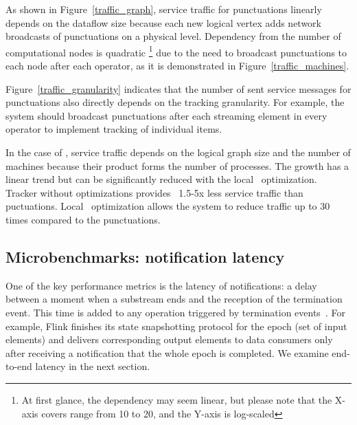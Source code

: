 As shown in Figure~\ref{traffic_graph}, service traffic for punctuations linearly depends on the dataflow size because each new logical vertex adds network broadcasts of punctuations on a physical level. Dependency from the number of computational nodes is quadratic \footnote{At first glance, the dependency may seem linear, but please note that the X-axis covers range from 10 to 20, and the Y-axis is log-scaled} due to the need to broadcast punctuations to each node after each operator, as it is demonstrated in Figure~\ref{traffic_machines}. 

Figure~\ref{traffic_granularity} indicates that the number of sent service messages for punctuations also directly depends on the tracking granularity. For example, the system should broadcast punctuations after each streaming element in every operator to implement tracking of individual items. 

In the case of \tracker, service traffic depends on the logical graph size and the number of machines because their product forms the number of processes. The growth has a linear trend but can be significantly reduced with the local \tracker\ optimization. Tracker without optimizations provides ~1.5-5x less service traffic than puctuations. Local \tracker\ optimization allows the system to reduce traffic up to 30 times compared to the punctuations.

\subsection{Microbenchmarks: notification latency}
\label{absolute-latency}

One of the key performance metrics is the latency of notifications: a delay between a moment when a substream ends and the reception of the termination event. This time is added to any operation triggered by termination events~\cite{Carbone:2017:SMA:3137765.3137777, we2018adbis}. For example, Flink finishes its state snapshotting protocol for the epoch (set of input elements) and delivers corresponding output elements to data consumers only after receiving a notification that the whole epoch is completed. We examine end-to-end latency in the next section.


